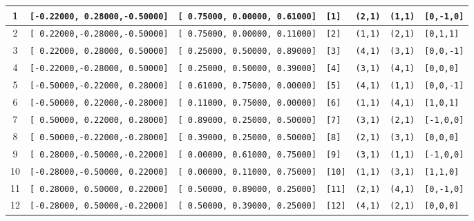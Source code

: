 \documentclass[fleqn,10pt,landscape]{jsarticle}
\begin{document}
\begin{longtable}[l]{cllllll}
1 & \texttt{[-0.22000, 0.28000,-0.50000]} & \texttt{[ 0.75000, 0.00000, 0.61000]} & \texttt{[1]} & \texttt{(2,1)} & \texttt{(1,1)} & \texttt{[0,-1,0]} \\ \hline
2 & \texttt{[ 0.22000,-0.28000,-0.50000]} & \texttt{[ 0.75000, 0.00000, 0.11000]} & \texttt{[2]} & \texttt{(1,1)} & \texttt{(2,1)} & \texttt{[0,1,1]} \\ \hline
3 & \texttt{[ 0.22000, 0.28000, 0.50000]} & \texttt{[ 0.25000, 0.50000, 0.89000]} & \texttt{[3]} & \texttt{(4,1)} & \texttt{(3,1)} & \texttt{[0,0,-1]} \\ \hline
4 & \texttt{[-0.22000,-0.28000, 0.50000]} & \texttt{[ 0.25000, 0.50000, 0.39000]} & \texttt{[4]} & \texttt{(3,1)} & \texttt{(4,1)} & \texttt{[0,0,0]} \\ \hline
5 & \texttt{[-0.50000,-0.22000, 0.28000]} & \texttt{[ 0.61000, 0.75000, 0.00000]} & \texttt{[5]} & \texttt{(4,1)} & \texttt{(1,1)} & \texttt{[0,0,-1]} \\ \hline
6 & \texttt{[-0.50000, 0.22000,-0.28000]} & \texttt{[ 0.11000, 0.75000, 0.00000]} & \texttt{[6]} & \texttt{(1,1)} & \texttt{(4,1)} & \texttt{[1,0,1]} \\ \hline
7 & \texttt{[ 0.50000, 0.22000, 0.28000]} & \texttt{[ 0.89000, 0.25000, 0.50000]} & \texttt{[7]} & \texttt{(3,1)} & \texttt{(2,1)} & \texttt{[-1,0,0]} \\ \hline
8 & \texttt{[ 0.50000,-0.22000,-0.28000]} & \texttt{[ 0.39000, 0.25000, 0.50000]} & \texttt{[8]} & \texttt{(2,1)} & \texttt{(3,1)} & \texttt{[0,0,0]} \\ \hline
9 & \texttt{[ 0.28000,-0.50000,-0.22000]} & \texttt{[ 0.00000, 0.61000, 0.75000]} & \texttt{[9]} & \texttt{(3,1)} & \texttt{(1,1)} & \texttt{[-1,0,0]} \\ \hline
10 & \texttt{[-0.28000,-0.50000, 0.22000]} & \texttt{[ 0.00000, 0.11000, 0.75000]} & \texttt{[10]} & \texttt{(1,1)} & \texttt{(3,1)} & \texttt{[1,1,0]} \\ \hline
11 & \texttt{[ 0.28000, 0.50000, 0.22000]} & \texttt{[ 0.50000, 0.89000, 0.25000]} & \texttt{[11]} & \texttt{(2,1)} & \texttt{(4,1)} & \texttt{[0,-1,0]} \\ \hline
12 & \texttt{[-0.28000, 0.50000,-0.22000]} & \texttt{[ 0.50000, 0.39000, 0.25000]} & \texttt{[12]} & \texttt{(4,1)} & \texttt{(2,1)} & \texttt{[0,0,0]} \\
\end{longtable}
\end{document}
